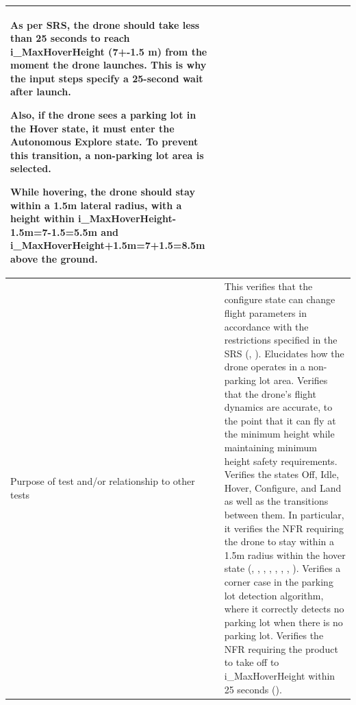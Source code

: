 \documentclass[12pt, titlepage]{article}
\begin{document}
\begin{table}[!h]
\begin{center}
\begin{tabular}{ | m{1.5cm} | m{15cm} | }
As per SRS, the drone should take less than 25 seconds to reach i\_MaxHoverHeight (7+-1.5 m) from the moment the drone launches. This is why the input steps specify a 25-second wait after launch.

Also, if the drone sees a parking lot in the Hover state, it must enter the Autonomous Explore state. To prevent this transition, a non-parking lot area is selected.

While hovering, the drone should stay within a 1.5m lateral radius, with a height within i\_MaxHoverHeight-1.5m=7-1.5=5.5m and i\_MaxHoverHeight+1.5m=7+1.5=8.5m above the ground.  
\\ 
\hline
Purpose of test and/or relationship to other tests & This verifies that the configure state can change flight parameters in accordance with the restrictions specified in the SRS (\nameref{GEN_003}, \nameref{GEN_004}).
Elucidates how the drone operates in a non-parking lot area.
Verifies that the drone's flight dynamics are accurate, to the point that it can fly at the minimum height while maintaining minimum height safety requirements.
Verifies the states Off, Idle, Hover, Configure, and Land as well as the transitions between them. In particular, it verifies the NFR requiring the drone to stay within a 1.5m radius within the hover state (\nameref{STA_000}, \nameref{STA_001}, \nameref{STA_004}, \nameref{STA_005}, \nameref{STA_006}, \nameref{TRANS_002}, \nameref{TRANS_003}, \nameref{TRANS_009}).
Verifies a corner case in the parking lot detection algorithm, where it correctly detects no parking lot when there is no parking lot.
Verifies the NFR requiring the product to take off to i\_MaxHoverHeight within 25 seconds (\nameref{PERF_002}). \\ 
\hline
\end{tabular}
\end{center}
\end{table}
\end{document}
